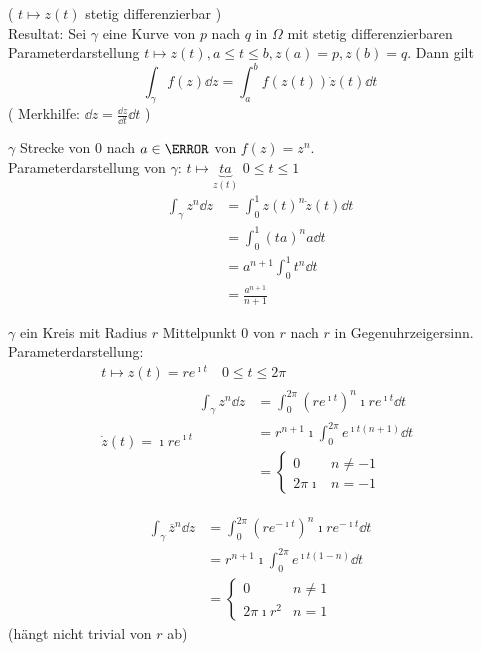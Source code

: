 ( $t \mapsto z(t)$ stetig differenzierbar ) \\
Resultat: Sei $\gamma$ eine Kurve von $p$ nach $q$ in $\Omega$ mit stetig differenzierbaren Parameterdarstellung $t \mapsto z(t) , a \leq t \leq b , z(a) = p , z(b) = q$. Dann gilt
\[ \int_\gamma f(z) \dd z = \int_a^b f(z(t)) \dot{z}(t) \dd t \]
( Merkhilfe: $\dd z = \frac{\dd z}{\dd t} \dd t$ ) \\
\begin{bsp}
	$\gamma$ Strecke von $0$ nach $a \in \C$ von $f(z) = z^n$. \\
	Parameterdarstellung von $\gamma$: $t \mapsto \underbrace{ta}_{z(t)}$ $0 \leq t \leq 1$
	\[ \begin{split}
		\int_\gamma z^n \dd z	&= \int_0^1 z(t)^n \dot{z}(t) \dd t \\
							&= \int_0^1 (ta)^n a \dd t \\
							&= a^{n+1} \int_0^1 t^n \dd t \\
							&= \frac{a^{n+1}}{n+1}
	\end{split} \]
\end{bsp}
\begin{bsp}
	$\gamma$ ein Kreis mit Radius $r$ Mittelpunkt $0$ von $r$ nach $r$ in Gegenuhrzeigersinn. Parameterdarstellung:
	\begin{gather*}
		t \mapsto z(t) = re^{\imath t} \quad 0 \leq t \leq 2\pi \\
		\dot{z}(t) = \imath re^{\imath t}
		\begin{split}
			\int_\gamma z^n \dd z	&= \int_0^{2\pi} (re^{\imath t})^n \imath re^{\imath t} \dd t \\
								&= r^{n+1} \imath \int_0^{2\pi} e^{\imath t(n+1)} \dd t \\
								&= \begin{cases}
									0		&n \neq -1	\\
									2\pi\imath	&n = -1	
								\end{cases}
		\end{split}
	\end{gather*}
\end{bsp}
\begin{bsp}
	\[ \begin{split}
		\int_\gamma \overline{z}^n \dd z	&= \int_0^{2\pi} (re^{-\imath t})^n \imath re^{-\imath t} \dd t \\
								&= r^{n+1} \imath \int_0^{2\pi} e^{\imath t(1-n)} \dd t \\
								&= \begin{cases}
									0			& n \neq 1	\\
									2\pi\imath r^2	&n = 1	
								\end{cases}
	\end{split} \]
	(hängt nicht trivial von $r$ ab)
\end{bsp}

